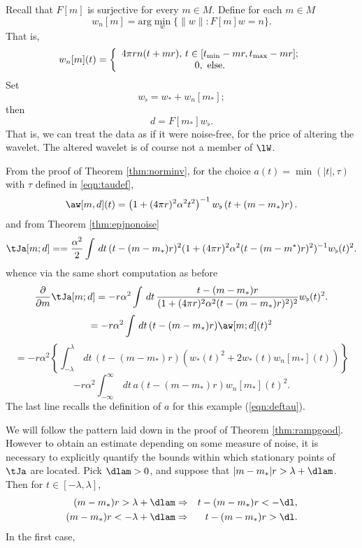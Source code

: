 Recall that $F[m]$ is surjective for every $m \in M$. Define for each
$m \in M$
\begin{equation}
  \label{eqn:defnoisewavelet}
  w_{n}[m] = \mbox{arg}\min_w\{\|w\|: F[m]w=n\}.
\end{equation}
That is,
\[
  w_n[m](t) =
  \left\{
    \begin{array}{c}
      4\pi r n(t+mr),\,t \in [t_{\rm min}-mr,t_{\rm max}-mr];\\
      0, \mbox{ else.}
    \end{array}
  \right.
\]
Set
\begin{equation}
  \label{eqn:defwflat}
  w_{\flat} = w_* + w_n[m_*];
\end{equation}
then
\begin{equation}
  \label{eqn:datacomplete}
  d = F[m_*]w_{\flat}.
\end{equation}
That is, we can treat the data as if it were noise-free, for the price
of altering the wavelet. The altered wavelet is of course not a member
of $\lW$.

From the proof of Theorem \ref{thm:norminv}, for the choice
$a(t)=\min(|t|,\tau)$ with $\tau$ defined in \ref{eqn:taudef},
\begin{equation}
  \label{eqn:solnoise}
  \aw[m,d](t)= \left(1+ (4\pi r)^2\alpha^2 t^2\right)^{-1}w_{\flat}\left(t+(m-m_*)r\right).
\end{equation}
and from Theorem \ref{thm:epjnonoise}
\begin{equation}
\label{eqn:expjgen}
\tJa[m;d] = =\frac{\alpha^2}{2}\int\,dt\,(t-(m-m_*)r)^2(1+(4\pi r)^2 \alpha^2 
  (t-(m-m^*)r)^2)^{-1}w_{\flat}(t)^2.
\end{equation}
whence via the same short computation as before
\[
  \frac{\partial}{\partial m}\tJa[m;d] = -r\alpha^2\int \,dt\,\frac{t-(m-m_*)r}{(1+(4\pi r)^2\alpha^2 (t-(m-m_*)r)^2)^2}w_{\flat}(t)^2. 
\]
\[
  = -r\alpha^2 \int \, dt \, (t-(m-m_*)r)\aw[m;d](t)^2 
\]  
\[
  = -r\alpha^2\left\{ \int_{-\lambda}^{\lambda} \, dt \, 
    (t-(m-m_*)r)(w_*(t)^2 +2w_*(t)w_n[m_*](t))\right\}
\]
\begin{equation}
  \label{eqn:gradnoise}
-r\alpha^2\int_{-\infty}^{\infty} \, dt \, a(t-(m-m_*)r) w_n[m_*](t)^2.
\end{equation}
The last line recalls the definition of $a$ for this example
(\ref{eqn:deftau}).

We will follow the pattern laid down in the proof of Theorem
\ref{thm:rampgood}. However to obtain an estimate depending on some
measure of noise, it is necessary to explicitly quantify the bounds
within which stationary points of $\tJa$ are located. Pick $\dlam >0$,
and suppose that $|m-m_*|r > \lambda + \dlam$. Then for $t \in
[-\lambda,\lambda]$,
\begin{eqnarray*}
  (m-m_*)r >   \lambda +\dlam & \Rightarrow & t-(m-m_*)r < -\dl, \\
  (m-m_*)r < -\lambda +\dlam & \Rightarrow & t-(m-m_*)r >   \dl.
\end{eqnarray*}
In the first case, 

